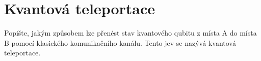 \section{Kvantová teleportace}
    Popište, jakým způsobem lze přenést stav kvantového qubitu z místa A do místa B pomocí klasického komunikačního kanálu. Tento jev se nazývá kvantová teleportace.